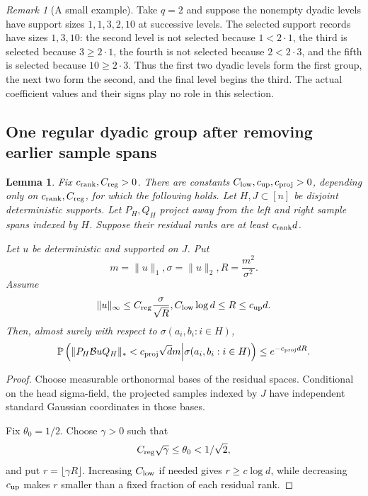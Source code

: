 \documentclass[11pt]{article}
\numberwithin{equation}{section}
\newtheorem{lemma}[theorem]{Lemma}
\theoremstyle{definition}
\theoremstyle{remark}
\newtheorem{remark}[theorem]{Remark}
\newcommand{\Pp}{\mathbb P}
\newcommand{\1}{\boldsymbol 1}
\begin{document}
\begin{aiblock}
\begin{remark}[A small example]
  Take $q=2$ and suppose the nonempty dyadic levels
  have support sizes $1,1,3,2,10$ at successive levels.
  The selected support records have sizes $1,3,10$: the
  second level is not selected because $1<2\cdot1$, the
  third is selected because $3\ge2\cdot1$, the fourth is
  not selected because $2<2\cdot3$, and the fifth is
  selected because $10\ge2\cdot3$. Thus the first two
  dyadic levels form the first group, the next two form
  the second, and the final level begins the third. The
  actual coefficient values and their signs play no role
  in this selection.
\end{remark}

\subsection{One regular dyadic group after removing
  earlier sample
  spans}\label{projected-regular-cluster-lemma}

\begin{lemma}\label{record-lemma-5-1}
  Fix $c_{\rm rank},C_{\rm reg}>0$. There are
  constants $C_{\rm low},c_{\rm up},c_{\rm proj}>0$,
  depending only on $c_{\rm rank},C_{\rm reg}$, for
  which the following holds. Let $H,J\subset[n]$ be
  disjoint deterministic supports. Let $P_H,Q_H$ project
  away from the left and right sample spans indexed by
  $H$. Suppose their residual ranks are at least
  $c_{\rm rank}d$.

  Let $u$ be deterministic and supported on $J$. Put
  \[
    m=\|u\|_1, \sigma=\|u\|_2,
    R=\frac{m^2}{\sigma^2}.
  \]
  Assume
  \[
    \|u\|_\infty\le C_{\rm reg}\frac\sigma{\sqrt R},
    C_{\rm low}\log d\le R\le c_{\rm up}d.
  \]
  Then, almost surely with respect to
  $\sigma(a_i,b_i:i\in H)$,
  \[
    \Pp\left(\|P_H\mathcal{B}uQ_H\|_*<c_{\rm proj}
    \sqrt d m\middle|\sigma(a_i,b_i:i\in H)\right)\le
    e^{-c_{\rm proj}dR}.
  \]
\end{lemma}

\begin{proof}
  Choose measurable orthonormal bases of the residual
  spaces. Conditional on the head sigma-field, the
  projected samples indexed by $J$ have independent
  standard Gaussian coordinates in those bases.

  Fix $\theta_0=1/2$. Choose $\gamma>0$ such that
  \[
    C_{\rm reg}\sqrt\gamma\le\theta_0<1/\sqrt2,
  \]
  and put $r=\lfloor\gamma R\rfloor$. Increasing
  $C_{\rm low}$ if needed gives $r\ge c\log d$, while
  decreasing $c_{\rm up}$ makes $r$ smaller than a fixed
  fraction of each residual rank.


\end{proof}
\end{aiblock}
\end{document}
